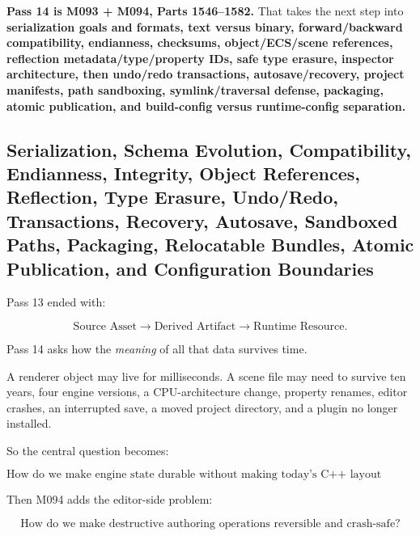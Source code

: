 \textbf{Pass 14 is M093 + M094, Parts 1546--1582.} That takes the next step into \textbf{serialization goals and formats, text versus binary, forward/backward compatibility, endianness, checksums, object/ECS/scene references, reflection metadata/type/property IDs, safe type erasure, inspector architecture, then undo/redo transactions, autosave/recovery, project manifests, path sandboxing, symlink/traversal defense, packaging, atomic publication, and build-config versus runtime-config separation.}

\subsection{Serialization, Schema Evolution, Compatibility, Endianness, Integrity, Object References, Reflection, Type Erasure, Undo/Redo, Transactions, Recovery, Autosave, Sandboxed Paths, Packaging, Relocatable Bundles, Atomic Publication, and Configuration Boundaries}\label{05-engine-i-ch011-serialization-schema-evolution-compatibility-endianness-integrity-object-references-reflection-type-erasure-undoredo-transactions-recovery-autosave-sandboxed-paths-packaging-relocatable-bundles-atomic-publication-and-configuration-boundaries}

\hypertarget{05-engine-i-ch011-serialization-schema-evolution-compatibility-endianness-integrity-object-references-reflection-type-erasure-undoredo-transactions-recovery-autosave-sandboxed-paths-packaging-relocatable-bundles-atomic-publication-and-configuration-boundaries}{}

Pass 13 ended with:

\[
\text{Source Asset}
\rightarrow
\text{Derived Artifact}
\rightarrow
\text{Runtime Resource}.
\]

Pass 14 asks how the \emph{meaning} of all that data survives time.

A renderer object may live for milliseconds. A scene file may need to survive ten years, four engine versions, a CPU-architecture change, property renames, editor crashes, an interrupted save, a moved project directory, and a plugin no longer installed.

So the central question becomes:

\[
\boxed{
\text{How do we make engine state durable without making today's C++ layout tomorrow's file format?}
}
\]

Then M094 adds the editor-side problem:

\[
\boxed{
\text{How do we make destructive authoring operations reversible and crash-safe?}
}
\]

